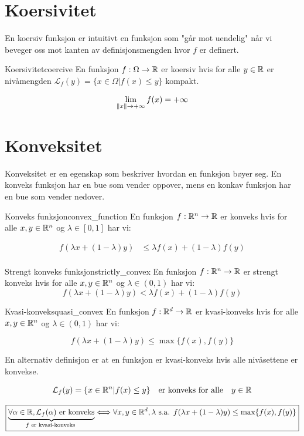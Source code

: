 \section{Koersivitet}

En koersiv funksjon er intuitivt en funksjon som "går mot uendelig" når vi beveger oss mot kanten av definisjonsmengden hvor \( f \) er definert.

\begin{definition}{Koersivitet}{coercive}
  En funksjon \(f: \Omega \to \mathbb{R}\) er koersiv hvis for alle \(y \in \mathbb{R}\) er nivåmengden \(\mathcal{L}_f(y) = \{x \in \Omega | f(x) \leq y\}\) kompakt.

  \[
    \lim_{\lVert x\rVert \to +\infty} f(x) = +\infty
  \]
\end{definition}

\section{Konveksitet}

Konveksitet er en egenskap som beskriver hvordan en funksjon bøyer seg.
En konveks funksjon har en bue som vender oppover, mens en konkav funksjon har en bue som vender nedover.

\begin{definition}{Konveks funksjon}{convex_function}
  En funksjon \(f: \mathbb{R}^n \to \mathbb{R}\) er konveks hvis for alle \(x, y \in \mathbb{R}^n\) og \(\lambda \in [0, 1]\) har vi:

  \begin{align*}
    f(\lambda x + (1 - \lambda)y) & \leq \lambda f(x) + (1 - \lambda)f(y) \\
  \end{align*}

\end{definition}
\begin{remark}{Strengt konveks funksjon}{strictly_convex}
  En funksjon \(f: \mathbb{R}^n \to \mathbb{R}\) er strengt konveks hvis for alle \(x, y \in \mathbb{R}^n\) og \(\lambda \in (0, 1)\) har vi:
  \[
    f(\lambda x + (1 - \lambda)y) < \lambda f(x) + (1 - \lambda)f(y)
  \]
\end{remark}

\begin{remark}{Kvasi-konveks}{quasi_convex}
  En funksjon \(f: \mathbb{R}^d \to \mathbb{R}\) er kvasi-konveks hvis for alle \(x, y \in \mathbb{R}^n\) og \(\lambda \in (0, 1)\) har vi:

  \[
    f(\lambda x + (1 - \lambda)y) \leq \max\{f(x), f(y)\}
  \]

  En alternativ definisjon er at en funksjon er kvasi-konveks hvis alle nivåsettene er konvekse.

  \[
    \mathcal{L}_f(y) = \{x \in \mathbb{R}^n | f(x) \leq y\} \quad \text{er konveks for alle} \quad y \in \mathbb{R}
  \]

  \[
    \boxed{\underbrace{\forall \alpha \in \mathbb{R}, \mathcal{L}_f(\alpha) \text{ er konveks}}_{f \text{ er kvasi-konveks }}\Longleftrightarrow \forall x, y \in \mathbb{R}^d,\lambda \text{ s.a. } f(\lambda x + (1-\lambda)y) \leq \max \{ f(x), f(y) \}}
  \]
\end{remark}


